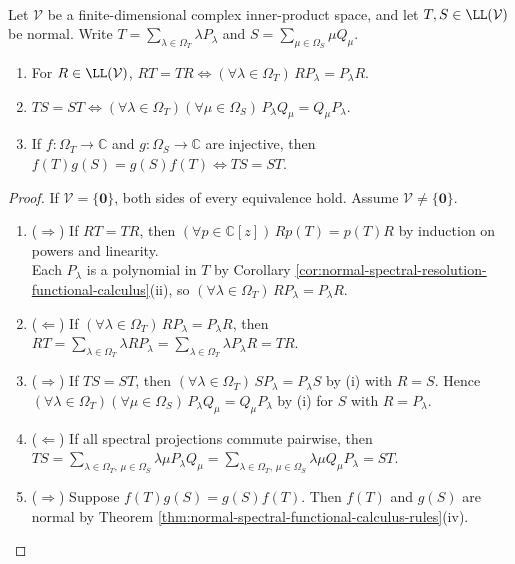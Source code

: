 \begin{theorem} \label{thm:normal-spectral-projection-commutativity} \\
Let $\mathcal{V}$ be a finite-dimensional complex inner-product space, and let $T,S\in\LL(\mathcal{V})$ be normal. Write $T=\sum\limits_{\lambda\in\Omega_T}\lambda P_{\lambda}$ and $S=\sum\limits_{\mu\in\Omega_S}\mu Q_{\mu}$.
\begin{enumerate}[label=(\roman*)]
\setlength{\itemsep}{0pt}
\item For $R\in\LL(\mathcal{V})$, $RT=TR\Longleftrightarrow(\forall\lambda\in\Omega_T)\,RP_{\lambda}=P_{\lambda}R$.
\item $TS=ST\Longleftrightarrow(\forall\lambda\in\Omega_T)(\forall\mu\in\Omega_S)\,P_{\lambda}Q_{\mu}=Q_{\mu}P_{\lambda}$.
\item If $f:\Omega_T\to\mathbb{C}$ and $g:\Omega_S\to\mathbb{C}$ are injective, then $f(T)g(S)=g(S)f(T)\Longleftrightarrow TS=ST$.
\end{enumerate}
\begin{proof}
If $\mathcal{V}=\{\mathbf{0}\}$, both sides of every equivalence hold. Assume $\mathcal{V}\neq\{\mathbf{0}\}$.
\begin{enumerate}[label=(\roman*)]
\setlength{\itemsep}{0pt}
\item[$(i)$] ($\Rightarrow$) If $RT=TR$, then $(\forall p\in\mathbb{C}[z])\,Rp(T)=p(T)R$ by induction on powers and linearity.\\
Each $P_{\lambda}$ is a polynomial in $T$ by Corollary \ref{cor:normal-spectral-resolution-functional-calculus}(ii), so $(\forall\lambda\in\Omega_T)\,RP_{\lambda}=P_{\lambda}R$.
\item[$(i)$] ($\Leftarrow$) If $(\forall\lambda\in\Omega_T)\,RP_{\lambda}=P_{\lambda}R$, then $RT=\sum\limits_{\lambda\in\Omega_T}\lambda RP_{\lambda}=\sum\limits_{\lambda\in\Omega_T}\lambda P_{\lambda}R=TR$.
\item[$(ii)$] ($\Rightarrow$) If $TS=ST$, then $(\forall\lambda\in\Omega_T)\,SP_{\lambda}=P_{\lambda}S$ by (i) with $R=S$. Hence $(\forall\lambda\in\Omega_T)(\forall\mu\in\Omega_S)\,P_{\lambda}Q_{\mu}=Q_{\mu}P_{\lambda}$ by (i) for $S$ with $R=P_{\lambda}$.
\item[$(ii)$] ($\Leftarrow$) If all spectral projections commute pairwise, then $TS=\sum\limits_{\lambda\in\Omega_T,\,\mu\in\Omega_S}\lambda\mu P_{\lambda}Q_{\mu}=\sum\limits_{\lambda\in\Omega_T,\,\mu\in\Omega_S}\lambda\mu Q_{\mu}P_{\lambda}=ST$.
\item[$(iii)$] ($\Rightarrow$) Suppose $f(T)g(S)=g(S)f(T)$. Then $f(T)$ and $g(S)$ are normal by Theorem \ref{thm:normal-spectral-functional-calculus-rules}(iv).\\

\end{enumerate}
\end{proof}
\end{theorem}
